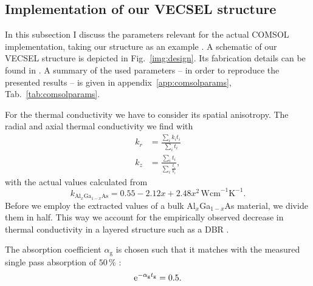 \subsection{Implementation of our VECSEL structure}
\label{app:comsol_deriv:impl}

In this subsection I discuss the parameters
relevant for the actual COMSOL implementation,
taking our structure as an example
\cite{Ranta2014OptLett}.
A schematic of our VECSEL structure
is depicted in Fig.~\ref{img:design}.
Its fabrication details can be found in
\cite{Ranta2014OptLett,Sirbu2014SPIE}.
A summary of the used parameters --
in order to reproduce the presented results --
is given in appendix~\ref{app:comsolparams},
Tab.~\ref{tab:comsolparams}.

For the thermal conductivity
we have to consider
its spatial anisotropy.
The radial and axial thermal conductivity
we find with
\cite{Vetter2012,Lindberg2005,Osinski1993}
\begin{align}
k_r &= \frac{\sum_i k_i t_i}{\sum_i t_i} \\
k_z &= \frac{\sum_i t_i}{\sum_i \frac{t_i}{k_i}},
\label{eq:radaxthermcond}
\end{align}
with the actual values calculated from \cite{ioffe}
\begin{equation}
k_{\mathrm{Al}_{x}\mathrm{Ga}_{1-x}\mathrm{As}} =
0.55-2.12x+2.48x^2\,\mathrm{Wcm}^{-1}\mathrm{K}^{-1}.
\label{eq:k_AlGaAs}
\end{equation}
Before we employ
the extracted values of
a bulk Al$_{x}$Ga$_{1-x}$As material,
we divide them in half.
This way we account for
the empirically observed decrease
in thermal conductivity
in a layered structure such as a DBR
\cite{Piprek1998,Ranta2014APL}.

The absorption coefficient $\alpha_\mathrm{g}$ 
is chosen such that
it matches with the measured single pass absorption of $50\,\%$
\cite{Ranta2014OptLett}:
\begin{equation*}
\mathrm{e}^{-\alpha_\mathrm{g}t_\mathrm{g}}=0.5.
\end{equation*}

